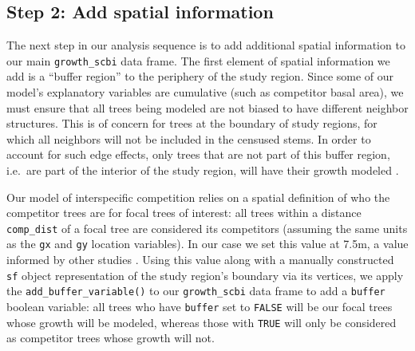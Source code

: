 \documentclass[12pt]{article}
\newenvironment{Shaded}{\begin{snugshade}}{\end{snugshade}}
\newcommand{\CommentTok}[1]{\textcolor[rgb]{0.56,0.35,0.01}{\textit{#1}}}
\newcommand{\DataTypeTok}[1]{\textcolor[rgb]{0.13,0.29,0.53}{#1}}
\newcommand{\DecValTok}[1]{\textcolor[rgb]{0.00,0.00,0.81}{#1}}
\newcommand{\FloatTok}[1]{\textcolor[rgb]{0.00,0.00,0.81}{#1}}
\newcommand{\KeywordTok}[1]{\textcolor[rgb]{0.13,0.29,0.53}{\textbf{#1}}}
\newcommand{\NormalTok}[1]{#1}
\newcommand{\OperatorTok}[1]{\textcolor[rgb]{0.81,0.36,0.00}{\textbf{#1}}}
\newcommand{\StringTok}[1]{\textcolor[rgb]{0.31,0.60,0.02}{#1}}
\begin{document}
\hypertarget{spatial-information}{%
\subsection{Step 2: Add spatial information}\label{spatial-information}}

The next step in our analysis sequence is to add additional spatial
information to our main \texttt{growth\_scbi} data frame. The first
element of spatial information we add is a ``buffer region'' to the
periphery of the study region. Since some of our model's explanatory
variables are cumulative (such as competitor basal area), we must ensure
that all trees being modeled are not biased to have different neighbor
structures. This is of concern for trees at the boundary of study
regions, for which all neighbors will not be included in the censused
stems. In order to account for such edge effects, only trees that are
not part of this buffer region, i.e.~are part of the interior of the
study region, will have their growth modeled
\citep{waller_applied_2004}.

Our model of interspecific competition relies on a spatial definition of
who the competitor trees are for focal trees of interest: all trees
within a distance \texttt{comp\_dist} of a focal tree are considered its
competitors (assuming the same units as the \texttt{gx} and \texttt{gy}
location variables). In our case we set this value at 7.5m, a value
informed by other studies \citep[\citet{uriarte_spatially_2004},
\citet{canham_neighborhood_2006}]{canham_neighborhood_2004}. Using this
value along with a manually constructed \texttt{sf} object
representation of the study region's boundary via its vertices, we apply
the \texttt{add\_buffer\_variable()} to our \texttt{growth\_scbi} data
frame to add a \texttt{buffer} boolean variable: all trees who have
\texttt{buffer} set to \texttt{FALSE} will be our focal trees whose
growth will be modeled, whereas those with \texttt{TRUE} will only be
considered as competitor trees whose growth will not.

\begin{Shaded}
\end{Shaded}
\end{document}
